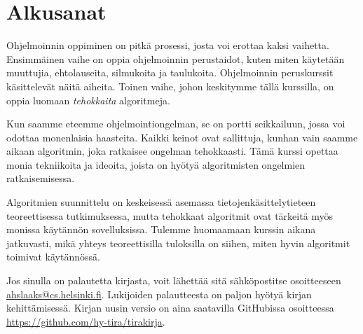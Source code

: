\chapter{Alkusanat}

Ohjelmoinnin oppiminen on pitkä prosessi,
josta voi erottaa kaksi vaihetta.
Ensimmäinen vaihe on oppia ohjelmoinnin perustaidot,
kuten miten käyte\-tään muuttujia, ehtolauseita, silmukoita ja taulukoita.
Ohjelmoinnin peruskurssit käsittelevät näitä aiheita.
Toinen vaihe, johon keskitymme tällä kurssilla,
on oppia luomaan \emph{tehokkaita} algoritmeja.

Kun saamme eteemme ohjelmointiongelman,
se on portti seikkailuun, jossa voi odottaa monenlaisia haasteita.
Kaikki keinot ovat sallittuja, kunhan vain saamme aikaan
algoritmin, joka ratkaisee ongelman tehokkaasti.
Tämä kurssi opettaa monia tekniikoita ja ideoita,
joista on hyötyä algoritmisten ongelmien ratkaisemisessa.

Algoritmien suunnittelu on keskeisessä asemassa tietojenkäsittelytieteen
teoreettisessa tutkimuksessa, mutta tehokkaat algoritmit ovat
tärkeitä myös monissa käytännön sovelluksissa.
Tulemme huomaamaan kurssin aikana jatkuvasti,
mikä yhteys teoreettisilla tuloksilla on siihen,
miten hyvin algoritmit toimivat käytännössä.

Jos sinulla on palautetta kirjasta, voit lähettää sitä
sähköpostitse osoitteeseen \url{ahslaaks@cs.helsinki.fi}.
Lukijoiden palautteesta on paljon hyötyä
kirjan kehittämisessä.
Kirjan uusin versio on aina saatavilla GitHubissa
osoitteessa \url{https://github.com/hy-tira/tirakirja}.

